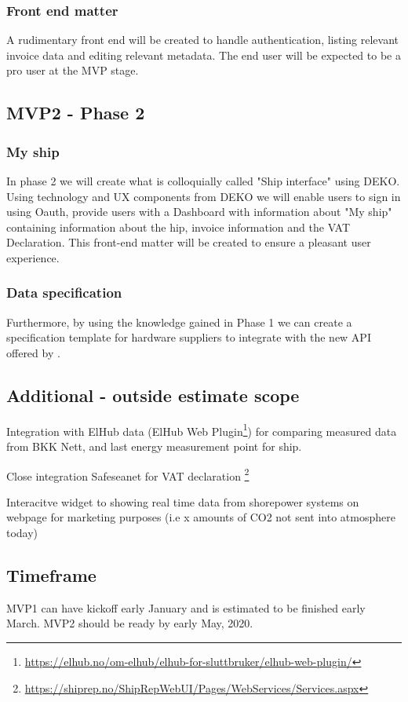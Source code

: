 \subsubsection{Front end matter}
A rudimentary front end will be created to handle authentication, listing relevant invoice data and editing relevant metadata. The end user will be expected to be a pro user at the MVP stage.

\subsection{MVP2 - Phase 2}

\subsubsection{My ship}
In phase 2 we will create what is colloquially called "Ship interface" using DEKO. Using technology and UX components from DEKO we will enable users to sign in using Oauth, provide users with a Dashboard with information about "My ship" containing information about the hip, invoice information and the VAT Declaration. This front-end matter will be created to ensure a pleasant user experience.

\subsubsection{Data specification}
Furthermore, by using the knowledge gained in Phase 1 we can create a specification template for hardware suppliers to integrate with the new API offered by \customername.

\subsection{Additional - outside estimate scope}


Integration with ElHub data (ElHub Web Plugin\footnote{\url{https://elhub.no/om-elhub/elhub-for-sluttbruker/elhub-web-plugin/}}) for comparing measured data from BKK Nett, and last energy measurement point for ship.

Close integration Safeseanet for VAT declaration \footnote{\url{https://shiprep.no/ShipRepWebUI/Pages/WebServices/Services.aspx}}

Interacitve widget to showing real time data from shorepower systems on webpage for marketing purposes (i.e x amounts of CO2 not sent into atmosphere today)

\subsection{Timeframe}
MVP1 can have kickoff early January and is estimated to be finished early March. MVP2 should be ready by early May, 2020.